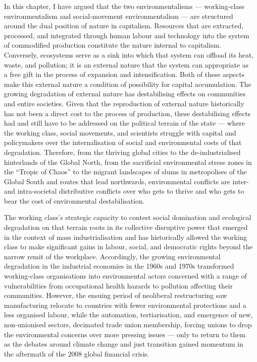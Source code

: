 \documentclass[a4paper, nobind]{templates/ociamthesis}
\begin{document}
In this chapter, I have argued that the two environmentalisms --- working-class environmentalism and social-movement environmentalism --- are structured around the dual position of nature in capitalism. Resources that are extracted, processed, and integrated through human labour and technology into the system of commodified production constitute the nature internal to capitalism. Conversely, ecosystems serve as a sink into which that system can offload its heat, waste, and pollution; it is an external nature that the system can appropriate as a free gift in the process of expansion and intensification. Both of these aspects make this external nature a condition of possibility for capital accumulation. The growing degradation of external nature has destabilising effects on communities and entire societies. Given that the reproduction of external nature historically has not been a direct cost to the process of production, these destabilising effects had and still have to be addressed on the political terrain of the state --- where the working class, social movements, and scientists struggle with capital and policymakers over the internalisation of social and environmental costs of that degradation. Therefore, from the thriving global cities to the de-industrialised hinterlands of the Global North, from the sacrificial environmental stress zones in the ``Tropic of Chaos'' to the migrant landscapes of slums in metropolises of the Global South and routes that lead northwards, environmental conflicts are inter- and intra-societal distributive conflicts over who gets to thrive and who gets to bear the cost of environmental destabilisation.

The working class's strategic capacity to contest social domination and ecological degradation on that terrain roots in its collective disruptive power that emerged in the context of mass industrialisation and has historically allowed the working class to make significant gains in labour, social, and democratic rights beyond the narrow remit of the workplace. Accordingly, the growing environmental degradation in the industrial economies in the 1960s and 1970s transformed working-class organisations into environmental actors concerned with a range of vulnerabilities from occupational health hazards to pollution affecting their communities. However, the ensuing period of neoliberal restructuring saw manufacturing relocate to countries with fewer environmental protections and a less organised labour, while the automation, tertiarisation, and emergence of new, non-unionised sectors, decimated trade union membership, forcing unions to drop the environmental concerns over more pressing issues --- only to return to them as the debates around climate change and just transition gained momentum in the aftermath of the 2008 global financial crisis.
\end{document}
